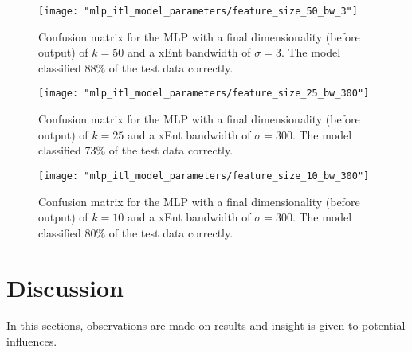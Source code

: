 \documentclass[conference]{IEEEtran}
\begin{document}
\begin{center}
	\begin{figure}[t]
		\centering
		\texttt{[image: "mlp\_itl\_model\_parameters/feature\_size\_50\_bw\_3"]}
		\caption{Confusion matrix for the MLP with a final dimensionality (before output) of $k=50$ and a xEnt bandwidth of $\sigma=3$.  The model classified 88\% of the test data correctly.}
		\label{fig:feature_size_50_bw_3}
	\end{figure}
\end{center}

\begin{center}
	\begin{figure}[t]
		\centering
		\texttt{[image: "mlp\_itl\_model\_parameters/feature\_size\_25\_bw\_300"]}
		\caption{Confusion matrix for the MLP with a final dimensionality (before output) of $k=25$ and a xEnt bandwidth of $\sigma=300$.  The model classified 73\% of the test data correctly.}
		\label{fig:feature_size_25_bw_300}
	\end{figure}
\end{center}

\begin{center}
	\begin{figure}[t]
		\centering
		\texttt{[image: "mlp\_itl\_model\_parameters/feature\_size\_10\_bw\_300"]}
		\caption{Confusion matrix for the MLP with a final dimensionality (before output) of $k=10$ and a xEnt bandwidth of $\sigma=300$.  The model classified 80\% of the test data correctly.}
		\label{fig:feature_size_10_bw_300}
	\end{figure}
\end{center}



\vspace{5cm}
\section{Discussion} \label{Discussion}
In this sections, observations are made on results and insight is given to potential influences.


\end{document}
